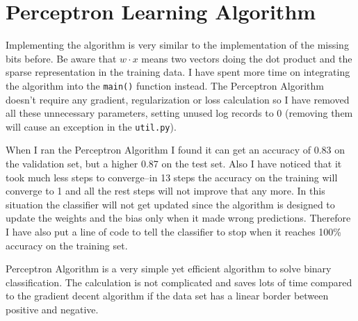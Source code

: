 \documentclass[11pt]{article} %
\begin{document}
\section{Perceptron Learning Algorithm}

Implementing the algorithm is very similar to the implementation of the missing bits before. Be aware that $w\cdot x$ means two vectors doing the dot product and the sparse representation in the training data. I have spent more time on integrating the algorithm into the \verb|main()| function instead. The Perceptron Algorithm doesn't require any gradient, regularization or loss calculation so I have removed all these unnecessary parameters, setting unused log records to 0 (removing them will cause an exception in the \verb|util.py|).

When I ran the Perceptron Algorithm I found it can get an accuracy of 0.83 on the validation set, but a higher 0.87 on the test set. Also I have noticed that it took much less steps to converge--in 13 steps the accuracy on the training will converge to 1 and all the rest steps will not improve that any more. In this situation the classifier will not get updated since the algorithm is designed to update the weights and the bias only when it made wrong predictions. Therefore I have also put a line of code to tell the classifier to stop when it reaches 100\% accuracy on the training set.

Perceptron Algorithm is a very simple yet efficient algorithm to solve binary classification. The calculation is not complicated and saves lots of time compared to the gradient decent algorithm if the data set has a linear border between positive and negative.
\end{document}
